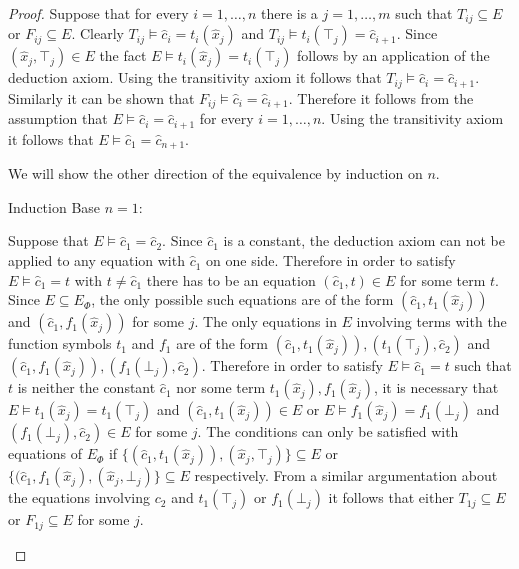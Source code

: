 \begin{proof}

Suppose that for every $i = 1,\ldots,n$ there is a $j = 1,\ldots,m$ such that $T_{ij} \subseteq E$ or $F_{ij} \subseteq E$.
Clearly $T_{ij} \models \hat{c}_i = t_i(\hat{x}_j)$ and $T_{ij} \models t_i(\top_j) = \hat{c}_{i+1}$. 
Since $(\hat{x}_j,\top_j) \in E$ the fact $E \models t_i(\hat{x}_j) = t_i(\top_j)$ follows by an application of the deduction axiom.
Using the transitivity axiom it follows that $T_{ij} \models \hat{c}_i = \hat{c}_{i+1}$.
Similarly it can be shown that $F_{ij} \models \hat{c}_i = \hat{c}_{i+1}$.
Therefore it follows from the assumption that $E \models \hat{c}_i = \hat{c}_{i+1}$ for every $i = 1,\ldots,n$.
Using the transitivity axiom it follows that $E \models \hat{c}_1 = \hat{c}_{n+1}$.


\noindent We will show the other direction of the equivalence by induction on $n$.
\begin{paragraph}{Induction Base $n = 1$:}

Suppose that $E \models \hat{c}_1 = \hat{c}_{2}$. %
Since $\hat{c}_1$ is a constant, the deduction axiom can not be applied to any equation with $\hat{c}_1$ on one side.
Therefore in order to satisfy $E \models \hat{c}_1 = t$ with $t \neq \hat{c}_1$ there has to be an equation $(\hat{c}_1, t) \in E$ for some term $t$.
Since $E \subseteq E_{\Phi}$, the only possible such equations are of the form $(\hat{c}_1, t_1(\hat{x}_j))$ and $(\hat{c}_1, f_1(\hat{x}_j))$ for some $j$.
The only equations in $E$ involving terms with the function symbols $t_1$ and $f_1$ are of the form $(\hat{c}_1, t_1(\hat{x}_j)), (t_1(\top_j),\hat{c}_2)$ and $(\hat{c}_1, f_1(\hat{x}_j)), (f_1(\bot_j),\hat{c}_2)$.
Therefore in order to satisfy $E \models \hat{c}_1 = t$ such that $t$ is neither the constant $\hat{c}_1$ nor some term $t_1(\hat{x}_j), f_1(\hat{x}_j)$, it is necessary that $E \models t_1(\hat{x}_j) = t_1(\top_j)$ and $(\hat{c}_1, t_1(\hat{x}_j)) \in E$ or $E \models f_1(\hat{x}_j) = f_1(\bot_j)$ and $(f_1(\bot_j),\hat{c}_2) \in E$ for some $j$.
The conditions can only be satisfied with equations of $E_{\Phi}$ if $\{(\hat{c}_1, t_1(\hat{x}_j)), (\hat{x}_j,\top_j)\} \subseteq E$ or $\{(\hat{c}_1, f_1(\hat{x}_j), (\hat{x}_j,\bot_j)\} \subseteq E$ respectively.
From a similar argumentation about the equations involving $c_2$ and $t_1(\top_j)$ or $f_1(\bot_j)$ it follows that either $T_{1j} \subseteq E$ or $F_{1j} \subseteq E$ for some $j$.
\end{paragraph}


\end{proof}
